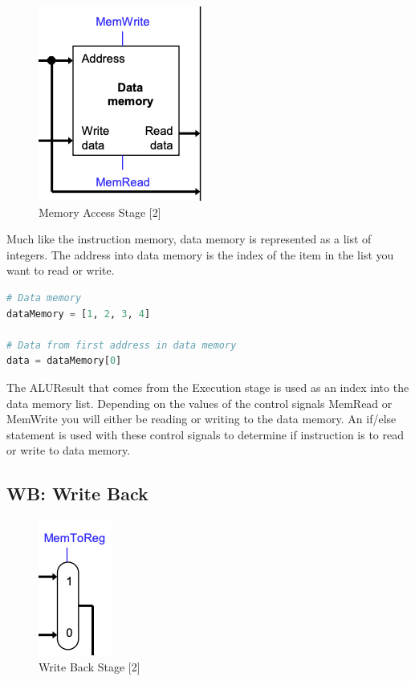 \documentclass[conference]{IEEEtran}
\begin{document}
\begin{figure}
    \centering
    \includegraphics[scale=.4]{memoryaccess.png}
    \caption{Memory Access Stage [2]}
    \label{fig:memoryaccess}
\end{figure}

Much like the instruction memory, data memory is represented as a list of integers.  The address into data memory is the index of the item in the list you want to read or write.

\begin{lstlisting}[language=Python]
# Data memory
dataMemory = [1, 2, 3, 4]

# Data from first address in data memory
data = dataMemory[0]
\end{lstlisting}

The ALUResult that comes from the Execution stage is used as an index into the data memory list.  Depending on the values of the control signals MemRead or MemWrite you will either be reading or writing to the data memory.  An if/else statement is used with these control signals to determine if instruction is to read or write to data memory.

\subsection{WB: Write Back}

\begin{figure}
    \centering
    \includegraphics[scale=.4]{writeback.png}
    \caption{Write Back Stage [2]}
    \label{fig:writeback}
\end{figure}
\end{document}
